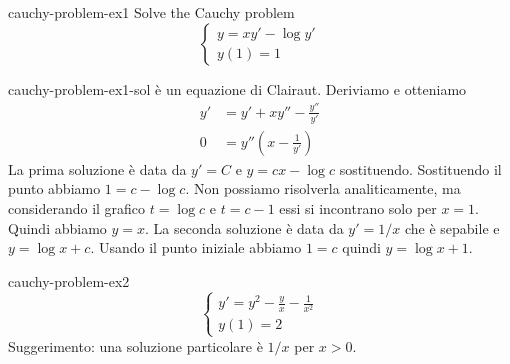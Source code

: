 \documentclass[preview]{standalone}
\begin{document}
\genpage

\begin{snippetexercise}{cauchy-problem-ex1}{}
    Solve the Cauchy problem
    \[
        \begin{cases}
            y = xy' - \log y' \\
            y(1) = 1
        \end{cases}
    \]
\end{snippetexercise}

\begin{snippetsolution}{cauchy-problem-ex1-sol}{}
    è un equazione di Clairaut. Deriviamo e otteniamo
    \begin{align*}
        y' &= y' + xy'' - \frac{y''}{y'} \\
        0 &= y''\left(x- \frac{1}{y'}\right)
    \end{align*}
    La prima soluzione è data da \(y' = C\) e \(y = cx - \log c\) sostituendo.
    Sostituendo il punto abbiamo \(1 = c - \log c\). Non possiamo risolverla analiticamente,
    ma considerando il grafico \(t=\log c\) e \(t=c-1\) essi si incontrano solo per \(x=1\).
    Quindi abbiamo \(y = x\).
    La seconda soluzione è data da \(y' = 1/x\) che è sepabile e \(y = \log x + c\).
    Usando il punto iniziale abbiamo \(1 = c\) quindi \(y = \log x + 1\).
\end{snippetsolution}

\begin{snippetexercise}{cauchy-problem-ex2}{}
    \[
        \begin{cases}
            y' = y^2 - \frac{y}{x} - \frac{1}{x^2}     \\
            y(1) = 2
        \end{cases}
    \]
    Suggerimento: una soluzione particolare è \(1/x\) per \(x>0\).
\end{snippetexercise}
\end{document}
